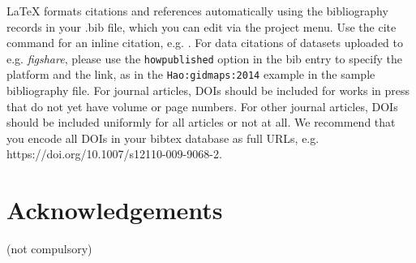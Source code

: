 \documentclass[fleqn,10pt]{wlscirep}
\begin{document}
%
%
%
%




\noindent LaTeX formats citations and references automatically using the bibliography records in your .bib file, which you can edit via the project menu. Use the cite command for an inline citation, e.g. \cite{Kaufman2020, Figueredo:2009dg, Babichev2002, behringer2014manipulating}. For data citations of datasets uploaded to e.g. \emph{figshare}, please use the \verb|howpublished| option in the bib entry to specify the platform and the link, as in the \verb|Hao:gidmaps:2014| example in the sample bibliography file. For journal articles, DOIs should be included for works in press that do not yet have volume or page numbers. For other journal articles, DOIs should be included uniformly for all articles or not at all. We recommend that you encode all DOIs in your bibtex database as full URLs, e.g. https://doi.org/10.1007/s12110-009-9068-2.

\section*{Acknowledgements} (not compulsory)
\end{document}
